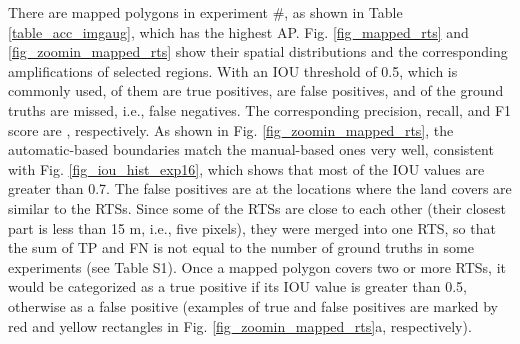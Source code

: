 \documentclass[authoryear,preprint,review,12pt]{elsarticle}
\begin{document}
There are  mapped polygons in experiment \#, as shown in Table \ref{table_acc_imgaug}, which has the highest AP.  Fig. \ref{fig_mapped_rts} and \ref{fig_zoomin_mapped_rts} show their spatial distributions and the corresponding ampliﬁcations of selected regions. With an IOU threshold of 0.5, which is commonly used,  of them are true positives,  are false positives, and  of the ground truths are missed, i.e., false negatives. The corresponding precision, recall, and F1 score are , respectively.  As shown in Fig. \ref{fig_zoomin_mapped_rts}, the automatic-based boundaries match the manual-based ones very well, consistent with Fig. \ref{fig_iou_hist_exp16}, which shows that most of the IOU values are greater than 0.7. The false positives are at the locations where the land covers are similar to the RTSs. Since some of the RTSs are close to each other (their closest part is less than 15 m, i.e., five pixels), they were merged into one RTS,
so that the sum of TP and FN is not equal to the number of ground truths in some experiments (see Table S1). Once a mapped polygon covers two or more RTSs, it would be categorized as a true positive if its IOU value is greater than 0.5, otherwise as a false positive (examples of true and false positives are marked by red and yellow rectangles in Fig. \ref{fig_zoomin_mapped_rts}a, respectively). 

\end{document}
